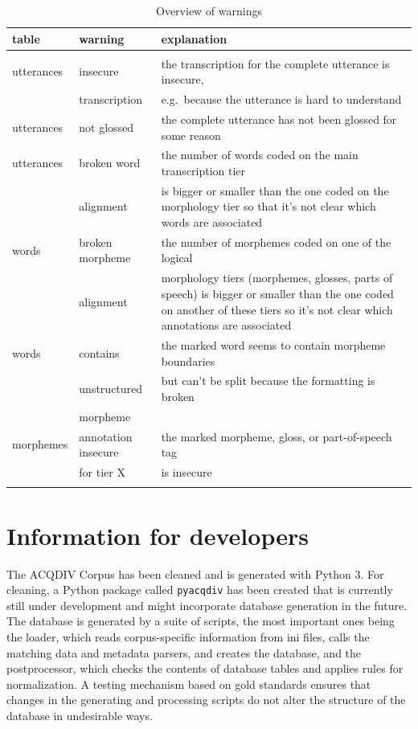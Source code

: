 \documentclass[a4paper, 11pt]{book}
\begin{document}
\begin{longtable}{lp{.2\linewidth}p{.6\linewidth}}
	\toprule
		\textbf{table} & \textbf{warning} & \textbf{explanation} \\
	\midrule
	\endhead
	
	\bottomrule\\[-0.15cm]
	\caption{Overview of warnings}
	\endfoot
	
	utterances 		& insecure			 		& the transcription for the complete utterance is insecure, \\
					& transcription 			& e.g.\ because the utterance is hard to understand \\
	utterances		& not glossed				& the complete utterance has not been glossed for some reason \\
	utterances		& broken word			 	& the number of words coded on the main transcription tier \\
					& alignment	 				& is bigger or smaller than the one coded on the morphology tier so that it’s not clear which words are associated \\
	words			& broken morpheme 			& the number of morphemes coded on one of the logical \\
					& alignment 				& morphology tiers (morphemes, glosses, parts of speech) is bigger or smaller than the one coded on another of these tiers so it’s not clear which annotations are associated \\
	words			& contains	 				& the marked word seems to contain morpheme boundaries \\
					& unstructured 				& but can’t be split because the formatting is broken \\
					& morpheme 					& \\
	morphemes		& annotation insecure 		& the marked morpheme, gloss, or part-of-speech tag \\
					& for tier X				& is insecure \\[-0.3cm]
	
	\label{tab:Overview of warnings}
\end{longtable}



\chapter{Information for developers}
\label{cha:Information for developers}

The ACQDIV Corpus has been cleaned and is generated with Python 3. For cleaning, a Python package called \texttt{pyacqdiv} has been created that is currently still under development and might incorporate database generation in the future. The database is generated by a suite of scripts, the most important ones being the loader, which reads corpus-specific information from ini files, calls the matching data and metadata parsers, and creates the database, and the postprocessor, which checks the contents of database tables and applies rules for normalization. A testing mechanism based on gold standards ensures that changes in the generating and processing scripts do not alter the structure of the database in undesirable ways. 
\end{document}
